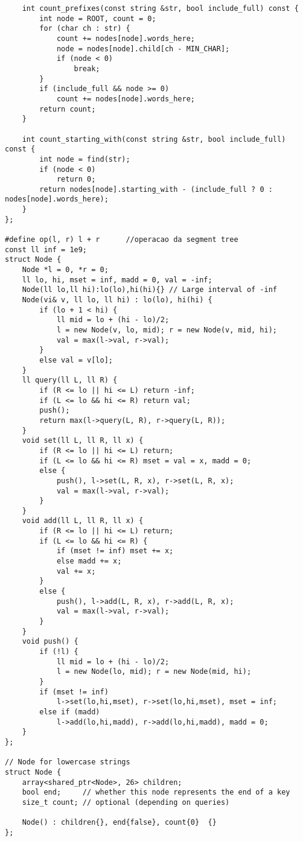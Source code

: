 \documentclass{article}
\begin{document}
\begin{lstlisting}
    int count_prefixes(const string &str, bool include_full) const {
        int node = ROOT, count = 0;
        for (char ch : str) {
            count += nodes[node].words_here;
            node = nodes[node].child[ch - MIN_CHAR];
            if (node < 0)
                break;
        }
        if (include_full && node >= 0)
            count += nodes[node].words_here;
        return count;
    }

    int count_starting_with(const string &str, bool include_full) const {
        int node = find(str);
        if (node < 0)
            return 0;
        return nodes[node].starting_with - (include_full ? 0 : nodes[node].words_here);
    }
};

#define op(l, r) l + r		//operacao da segment tree
const ll inf = 1e9;
struct Node {
    Node *l = 0, *r = 0;
    ll lo, hi, mset = inf, madd = 0, val = -inf;
    Node(ll lo,ll hi):lo(lo),hi(hi){} // Large interval of -inf
    Node(vi& v, ll lo, ll hi) : lo(lo), hi(hi) {
        if (lo + 1 < hi) {
            ll mid = lo + (hi - lo)/2;
            l = new Node(v, lo, mid); r = new Node(v, mid, hi);
            val = max(l->val, r->val);
        }
        else val = v[lo];
    }
    ll query(ll L, ll R) {
        if (R <= lo || hi <= L) return -inf;
        if (L <= lo && hi <= R) return val;
        push();
        return max(l->query(L, R), r->query(L, R));
    }
    void set(ll L, ll R, ll x) {
        if (R <= lo || hi <= L) return;
        if (L <= lo && hi <= R) mset = val = x, madd = 0;
        else {
            push(), l->set(L, R, x), r->set(L, R, x);
            val = max(l->val, r->val);
        }
    }
    void add(ll L, ll R, ll x) {
        if (R <= lo || hi <= L) return;
        if (L <= lo && hi <= R) {
            if (mset != inf) mset += x;
            else madd += x;
            val += x;
        }
        else {
            push(), l->add(L, R, x), r->add(L, R, x);
            val = max(l->val, r->val);
        }
    }
    void push() {
        if (!l) {
            ll mid = lo + (hi - lo)/2;
            l = new Node(lo, mid); r = new Node(mid, hi);
        }
        if (mset != inf)
            l->set(lo,hi,mset), r->set(lo,hi,mset), mset = inf;
        else if (madd)
            l->add(lo,hi,madd), r->add(lo,hi,madd), madd = 0;
    }
};

// Node for lowercase strings
struct Node {
	array<shared_ptr<Node>, 26> children;
	bool end;     // whether this node represents the end of a key
	size_t count; // optional (depending on queries)

	Node() : children{}, end{false}, count{0}  {}
};


\end{lstlisting}
\end{document}
